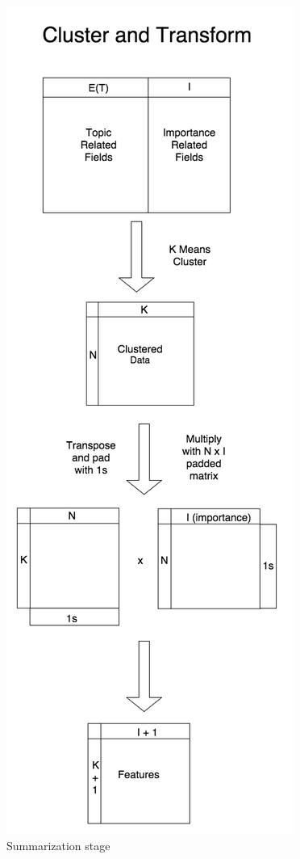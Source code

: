 \begin{figure}[ht]
\begin{center}
\centerline{\includegraphics[scale=0.15]{images/cluster_and_transform_vertical.png}}
\caption{Summarization stage}
\end{center}
\vskip -0.2in
\label{fig:summarization}
\end{figure} 